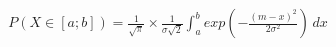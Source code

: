 \documentclass[preview]{standalone}
\begin{document}
\begin{align*}
P( X \in [a;b] ) = { \frac{1}{\sqrt{\pi}} } \times { \frac{1}{\sigma \sqrt{2}} } \int_a^b { exp(-{ \frac{(m - x)^2}{2 \sigma^2} }) } \, dx
\end{align*}
\end{document}
